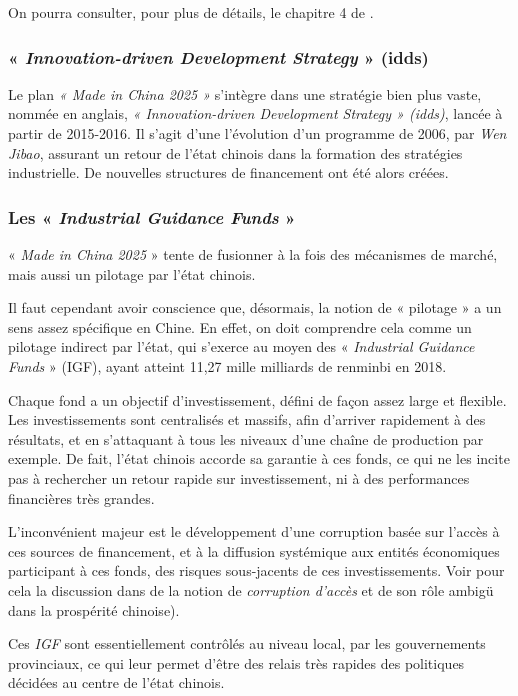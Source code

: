 \documentclass[a4paper]{article}
\begin{document}
On pourra consulter, pour plus de détails, le chapitre 4 de \cite{heilmann17_chinas}. 

\subsubsection{« \textit{Innovation-driven Development Strategy} » (idds)}
\label{sec:org3a525f5}
    Le plan \textit{« Made in China 2025 »} s’intègre dans une stratégie bien plus vaste, nommée en anglais, \textit{« Innovation-driven Development Strategy » (idds)}, lancée à partir de 2015-2016. Il s’agit d'une l'évolution d’un programme de 2006, par \textit{Wen Jibao}, assurant un retour de l’état chinois dans la formation des stratégies industrielle. De nouvelles structures de financement ont été alors créées.


\subsubsection{Les « \textit{Industrial Guidance Funds} »}
\label{sec:org4650fde}
« \textit{Made in China 2025} » tente de fusionner à la fois des mécanismes de marché, mais aussi un pilotage par l’état chinois.

Il faut cependant avoir conscience que, désormais, la notion de « pilotage » a un sens assez spécifique en Chine. En effet, on doit comprendre cela comme un pilotage indirect par l’état, qui s’exerce au moyen des « \textit{Industrial Guidance Funds} » (IGF), ayant atteint 11,27 mille milliards de renminbi en 2018. 

Chaque fond a un objectif d’investissement, défini de façon assez large et flexible. Les investissements sont centralisés et massifs, afin d’arriver rapidement à des résultats, et en s’attaquant à tous les niveaux d’une chaîne de production par exemple. De fait, l’état chinois accorde sa garantie à ces fonds, ce qui ne les incite pas à rechercher un retour rapide sur investissement, ni à des performances financières très grandes.

L’inconvénient majeur est le développement d’une corruption basée sur l’ac\-cès à ces sources de financement, et à la diffusion systémique aux entités éco\-no\-mi\-ques participant à ces fonds, des risques sous-jacents de ces investissements. Voir pour cela la discussion dans \cite{ang20_chinas} de la notion de \textit{corruption d’accès} et de son rôle ambigü dans la prospérité chinoise).

 Ces \textit{IGF} sont essentiellement contrôlés au niveau local, par les gouvernements provinciaux, ce qui leur permet d’être des relais très rapides des politiques décidées au centre de l’état chinois.
\end{document}
